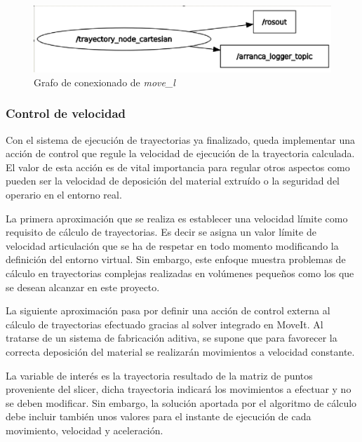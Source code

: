 \begin{figure}[h!]
    \centering
    \includegraphics[scale=0.40]{figuras/grafo move_l.png}
    \caption{Grafo de conexionado de \textit{move\_l}}
    \label{fig:grafo move_l}
\end{figure}



\subsubsection*{Control de velocidad}
\hypertarget{Control de velocidad}{}
\label{sec:control _velocidad}
Con el sistema de ejecución de trayectorias ya finalizado, queda implementar una acción de control que regule la velocidad de ejecución de la trayectoria calculada. El valor de esta acción es de vital importancia para regular otros aspectos como pueden ser la velocidad de deposición del material extruído o la seguridad del operario en el entorno real.

La primera aproximación que se realiza es establecer una velocidad límite como requisito de cálculo de trayectorias. Es decir se asigna un valor límite de velocidad articulación que se ha de respetar en todo momento modificando la definición del entorno virtual. Sin embargo, este enfoque muestra problemas de cálculo en trayectorias complejas realizadas en volúmenes pequeños como los que se desean alcanzar en este proyecto.

La siguiente aproximación pasa por definir una acción de control externa al cálculo de trayectorias efectuado gracias al solver integrado en MoveIt. Al tratarse de un sistema de fabricación aditiva, se supone que para favorecer la correcta deposición del material se realizarán movimientos a velocidad constante.

La variable de interés es la trayectoria resultado de la matriz de puntos proveniente del slicer, dicha trayectoria indicará los movimientos a efectuar y no se deben modificar. Sin embargo, la solución aportada por el algoritmo de cálculo debe incluir también unos valores para el instante de ejecución de cada movimiento, velocidad y aceleración. 

